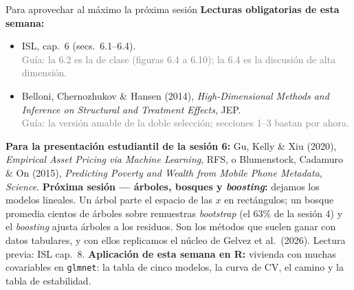 \documentclass{beamer}
\newcommand{\1}{\mathbb{I}}
\begin{document}
\begin{frame}{Para aprovechar al máximo la próxima sesión}
\small
\textbf{Lecturas obligatorias de esta semana:}
\begin{itemize}\itemsep4pt
  \item ISL, cap.\ 6 (secs.\ 6.1--6.4). \\ \textcolor{gray}{Guía: la 6.2 es la de clase (figuras 6.4 a 6.10); la 6.4 es la discusión de alta dimensión.}
  \item Belloni, Chernozhukov \& Hansen (2014), \emph{High-Dimensional Methods and Inference on Structural and Treatment Effects}, JEP. \\ \textcolor{gray}{Guía: la versión amable de la doble selección; secciones 1--3 bastan por ahora.}
\end{itemize}
\textbf{Para la presentación estudiantil de la sesión 6:} Gu, Kelly \& Xiu (2020), \emph{Empirical Asset Pricing via Machine Learning}, RFS, o Blumenstock, Cadamuro \& On (2015), \emph{Predicting Poverty and Wealth from Mobile Phone Metadata}, \emph{Science}.
\pause
\vspace{0.1cm}
\textbf{Próxima sesión --- árboles, bosques y \emph{boosting}:} dejamos los modelos lineales. Un árbol parte el espacio de las $x$ en rectángulos; un bosque promedia cientos de árboles sobre remuestras \emph{bootstrap} (el 63\% de la sesión 4) y el \emph{boosting} ajusta árboles a los residuos. Son los métodos que suelen ganar con datos tabulares, y con ellos replicamos el núcleo de Gelvez et al.\ (2026). Lectura previa: ISL cap.\ 8.
\pause
\vspace{0.1cm}
\textbf{Aplicación de esta semana en R:} vivienda con muchas covariables en \texttt{glmnet}: la tabla de cinco modelos, la curva de CV, el camino y la tabla de estabilidad.
\end{frame}
\end{document}
